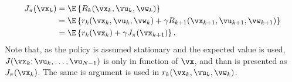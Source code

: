 \begin{align}
  J_\pi(\vx_k) &= \E\left\{ R_k(\vx_k,\vu_k,\vw_k)  \right\} \\
               &= \E\left\{ r_k(\vx_k,\vu_k,\vw_k) + \gamma R_{k+1}(\vx_{k+1},\vu_{k+1},\vw_{k+1})\right\} \\
               &= \E\left\{ r_k(\vx_k) + \gamma J_\pi(\vx_{k+1})  \right\} 
\label{eq:policy_evaluation_1}.
\end{align}
Note that, as the policy is assumed stationary and the expected value is used, $J(\vx_k;\vu_k, \dots, \vu_{N-1})$ is only in function of $\vx$, and than is presented as $J_\pi(\vx_k)$. The same is argument is used in $r_k(\vx_k,\vu_k,\vw_k)$. 



